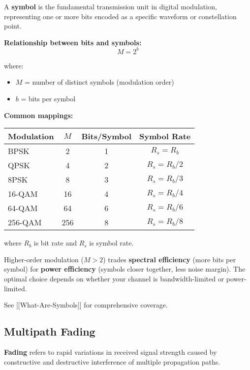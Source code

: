 A \textbf{symbol} is the fundamental transmission unit in digital modulation, representing one or more bits encoded as a specific waveform or constellation point.

\textbf{Relationship between bits and symbols:}
\begin{equation}
M = 2^b
\label{eq:symbol_order}
\end{equation}

where:
\begin{itemize}
\item $M$ = number of distinct symbols (modulation order)
\item $b$ = bits per symbol
\end{itemize}

\textbf{Common mappings:}
\begin{center}
\begin{tabular}{lccc}
\toprule
\textbf{Modulation} & \textbf{$M$} & \textbf{Bits/Symbol} & \textbf{Symbol Rate} \\
\midrule
BPSK & 2 & 1 & $R_s = R_b$ \\
QPSK & 4 & 2 & $R_s = R_b/2$ \\
8PSK & 8 & 3 & $R_s = R_b/3$ \\
16-QAM & 16 & 4 & $R_s = R_b/4$ \\
64-QAM & 64 & 6 & $R_s = R_b/6$ \\
256-QAM & 256 & 8 & $R_s = R_b/8$ \\
\bottomrule
\end{tabular}
\end{center}

where $R_b$ is bit rate and $R_s$ is symbol rate.

\begin{keyconcept}
Higher-order modulation ($M > 2$) trades \textbf{spectral efficiency} (more bits per symbol) for \textbf{power efficiency} (symbols closer together, less noise margin). The optimal choice depends on whether your channel is bandwidth-limited or power-limited.
\end{keyconcept}

See {[}{[}What-Are-Symbols{]}{]} for comprehensive coverage.

\subsection{Multipath Fading}

\textbf{Fading} refers to rapid variations in received signal strength caused by constructive and destructive interference of multiple propagation paths.

